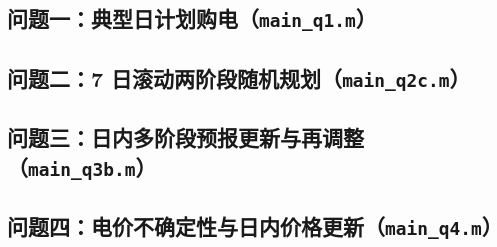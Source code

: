 
\subsection{问题一：典型日计划购电（\texttt{main\_q1.m}）}

\subsection{问题二：7 日滚动两阶段随机规划（\texttt{main\_q2c.m}）}

\subsection{问题三：日内多阶段预报更新与再调整（\texttt{main\_q3b.m}）}

\subsection{问题四：电价不确定性与日内价格更新（\texttt{main\_q4.m}）}
